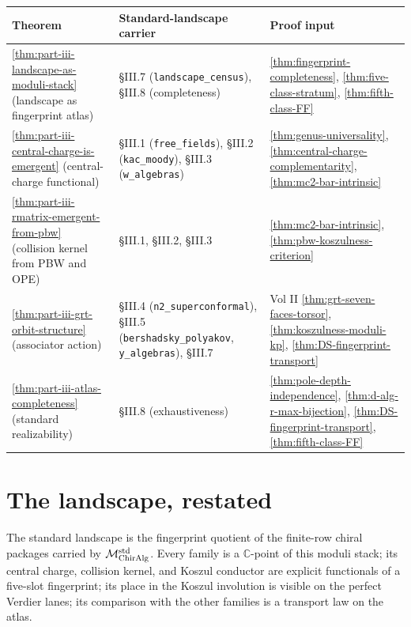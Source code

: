 \begin{center}
\begin{tabular}{p{3.8cm}|p{6.2cm}|p{4.5cm}}
\hline
\textbf{Theorem} & \textbf{Standard-landscape carrier} &
\textbf{Proof input} \\
\hline
\ref{thm:part-iii-landscape-as-moduli-stack}
 (landscape as fingerprint atlas)
 & \S III.7 (\texttt{landscape\_census}),
 \S III.8 (completeness)
 & \ref{thm:fingerprint-completeness},
 \ref{thm:five-class-stratum},
 \ref{thm:fifth-class-FF} \\
\hline
\ref{thm:part-iii-central-charge-is-emergent}
 (central-charge functional)
 & \S III.1 (\texttt{free\_fields}),
 \S III.2 (\texttt{kac\_moody}),
 \S III.3 (\texttt{w\_algebras})
 & \ref{thm:genus-universality},
 \ref{thm:central-charge-complementarity},
 \ref{thm:mc2-bar-intrinsic} \\
\hline
\ref{thm:part-iii-rmatrix-emergent-from-pbw}
 (collision kernel from PBW and OPE)
 & \S III.1, \S III.2, \S III.3
 & \ref{thm:mc2-bar-intrinsic},
 \ref{thm:pbw-koszulness-criterion} \\
\hline
\ref{thm:part-iii-grt-orbit-structure}
 (associator action)
 & \S III.4 (\texttt{n2\_superconformal}),
 \S III.5 (\texttt{bershadsky\_polyakov}, \texttt{y\_algebras}),
 \S III.7
 & Vol II \ref{thm:grt-seven-faces-torsor},
 \ref{thm:koszulness-moduli-kp},
 \ref{thm:DS-fingerprint-transport} \\
\hline
\ref{thm:part-iii-atlas-completeness}
 (standard realizability)
 & \S III.8 (exhaustiveness)
 & \ref{thm:pole-depth-independence},
 \ref{thm:d-alg-r-max-bijection},
 \ref{thm:DS-fingerprint-transport},
 \ref{thm:fifth-class-FF} \\
\hline
\end{tabular}
\end{center}

\section{The landscape, restated}
\label{sec:part-iii-landscape-restated}

The standard landscape is the fingerprint quotient of the finite-row
chiral packages carried by
$\mathcal{M}_{\mathrm{ChirAlg}}^{\mathrm{std}}$. Every family is a
$\mathbb{C}$-point of this moduli stack; its central charge,
collision kernel, and Koszul conductor are explicit functionals of
a five-slot fingerprint; its place in the Koszul involution is visible
on the perfect Verdier lanes; its comparison with the other families
is a transport law on the atlas.

